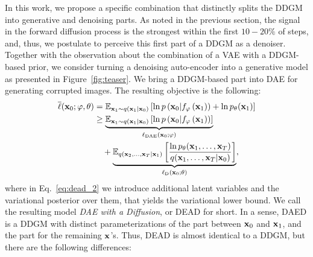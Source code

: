In this work, we propose a specific combination that distinctly splits the DDGM into generative and denoising parts. As noted in the previous section, the signal in the forward diffusion process is the strongest within the first $10-20\%$ of steps, and, thus, we postulate to perceive this first part of a DDGM as a denoiser. 
Together with the observation about the combination of a VAE with a DDGM-based prior, we consider turning a denoising auto-encoder into a generative model as presented in Figure~\ref{fig:teaser}. We bring a DDGM-based part into DAE for generating corrupted images. The resulting objective is the following:
\begin{align}
    \overline{\ell}(\rvx_0;\varphi, \theta) &= \mathbb{E}_{\rvx_1 \sim q(\rvx_1 | \rvx_0)}\left[\ln p\left(\rvx_0 | f_{\varphi}\left(\rvx_1\right)\right) + \ln p_{\theta}(\rvx_1)\right] \label{eq:daed_1}\\ 
    &\geq \underbrace{\mathbb{E}_{\rvx_1 \sim q(\rvx_1 | \rvx_0)}\left[\ln p\left(\rvx_0 | f_{\varphi}\left(\rvx_1\right)\right)\right]}_{\ell_{\text{DAE}}(\rvx_0;\varphi)} \\
    &\quad + \underbrace{\mathbb{E}_{q(\rvx_2, \ldots , \rvx_T | \rvx_1)} \left[ \frac{\ln p_{\theta}(\rvx_1, \ldots, \rvx_T)}{q(\rvx_1, \ldots , \rvx_T | \rvx_0)} \right]}_{\ell_{\text{D}}(\rvx_0;\theta)} \label{eq:dead_2},
\end{align}
where in Eq.~\ref{eq:dead_2} we introduce additional latent variables and the variational posterior over them, that yields the variational lower bound. We call the resulting model \textit{DAE with a Diffusion}, or DEAD for short. In a sense, DAED is a DDGM with distinct parameterizations of the part between ${\mathbf{x}}_0$ and ${\mathbf{x}}_1$, and the part for the remaining ${\mathbf{x}}$'s. Thus, DEAD is almost identical to a DDGM, but there are the following differences:
